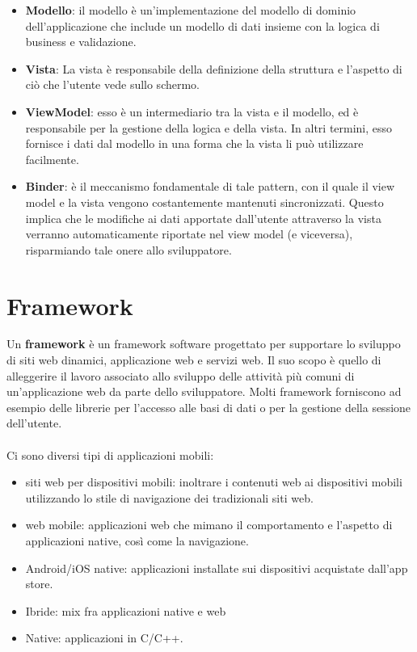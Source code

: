 \begin{itemize}
\begin{itemize}
\item \textbf{Modello}: il modello è un'implementazione del modello di dominio dell'applicazione che include un modello di dati insieme con la logica di business e validazione.
\item \textbf{Vista}: La vista è responsabile della definizione della struttura e l'aspetto di ciò che l'utente vede sullo schermo.
\item \textbf{ViewModel}: esso è un intermediario tra la vista e il modello, ed è responsabile per la gestione della logica e della vista. In altri termini, esso fornisce i dati dal modello in una forma che la vista li può utilizzare facilmente.
\item \textbf{Binder}: è il meccanismo fondamentale di tale pattern, con il quale il view model e la vista vengono costantemente mantenuti sincronizzati. Questo implica che le modifiche ai dati apportate dall'utente attraverso la vista verranno automaticamente riportate nel view model (e viceversa), risparmiando tale onere allo sviluppatore.
\end{itemize}
\end{itemize}
\section{Framework}
Un \textbf{framework} è un framework software progettato per supportare lo sviluppo di siti web dinamici, applicazione web e servizi web. Il suo scopo è quello di alleggerire il lavoro associato allo sviluppo delle attività più comuni di un'applicazione web da parte dello sviluppatore. Molti framework forniscono ad esempio delle librerie per l'accesso alle basi di dati o per la gestione della sessione dell'utente.\\\\Ci sono diversi tipi di applicazioni mobili:
\begin{itemize}
\item siti web per dispositivi mobili: inoltrare i contenuti web ai dispositivi mobili utilizzando lo stile di navigazione dei tradizionali siti web.
\item web mobile: applicazioni web che mimano il comportamento e l'aspetto di applicazioni native, così come la navigazione.
\item Android/iOS native: applicazioni installate sui dispositivi acquistate dall'app store.
\item Ibride: mix fra applicazioni native e web
\item Native: applicazioni in C/C++.
\end{itemize}
